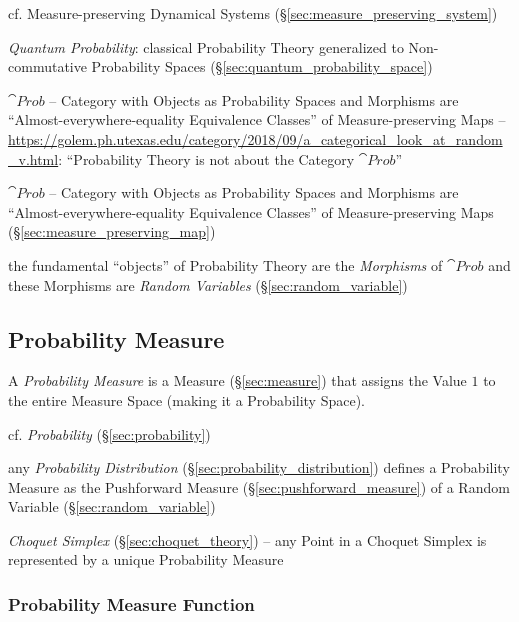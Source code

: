 \fist cf. Measure-preserving Dynamical Systems
(\S\ref{sec:measure_preserving_system})

\fist \emph{Quantum Probability}: classical Probability Theory generalized to
Non-commutative Probability Spaces (\S\ref{sec:quantum_probability_space})

$\cat{Prob}$ -- Category with Objects as Probability Spaces and Morphisms are
``Almost-everywhere-equality Equivalence Classes'' of Measure-preserving Maps
--
\url{https://golem.ph.utexas.edu/category/2018/09/a_categorical_look_at_random_v.html}:
``Probability Theory is not about the Category $\cat{Prob}$''

$\cat{Prob}$ -- Category with Objects as Probability Spaces and Morphisms are
``Almost-everywhere-equality Equivalence Classes'' of Measure-preserving Maps
(\S\ref{sec:measure_preserving_map})

the fundamental ``objects'' of Probability Theory are the \emph{Morphisms} of
$\cat{Prob}$ and these Morphisms are \emph{Random Variables}
(\S\ref{sec:random_variable})



\subsection{Probability Measure}\label{sec:probability_measure}

A \emph{Probability Measure} is a Measure (\S\ref{sec:measure}) that assigns the
Value $1$ to the entire Measure Space (making it a Probability Space).

cf. \emph{Probability} (\S\ref{sec:probability})

\fist any \emph{Probability Distribution} (\S\ref{sec:probability_distribution})
defines a Probability Measure as the Pushforward Measure
(\S\ref{sec:pushforward_measure}) of a Random Variable
(\S\ref{sec:random_variable})

\emph{Choquet Simplex} (\S\ref{sec:choquet_theory}) -- any Point in a Choquet
Simplex is represented by a unique Probability Measure



\subsubsection{Probability Measure Function}
\label{sec:probability_measure_function}


